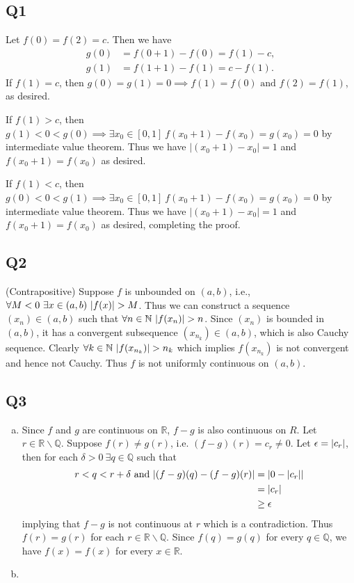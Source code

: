 \documentclass[12pt,lettersize]{article}
\newcommand{\R}{\mathbb{R}}
\newcommand{\Q}{\mathbb{Q}}
\newcommand{\N}{\mathbb{N}}
\begin{document}
	
	\subsection*{Q1}
	Let $f(0)=f(2)=c$. Then we have
	\begin{align*}
		g(0) &= f(0+1)-f(0)=f(1)-c,\\
		g(1) &= f(1+1)-f(1)=c-f(1).
	\end{align*}
	If $f(1)=c$, then $g(0)=g(1)=0\implies f(1)=f(0)\text{ and }f(2)=f(1)$, as desired.\smallskip
	
	If $f(1)>c$, then $g(1)<0<g(0)\implies \exists x_0\in[0,1]\ f(x_0+1)-f(x_0)=g(x_0)=0$ by intermediate value theorem. Thus we have $|(x_0+1)-x_0|=1$ and $f(x_0+1)=f(x_0)$ as desired.\smallskip
	
	If $f(1)<c$, then $g(0)<0<g(1)\implies \exists x_0\in[0,1]\ f(x_0+1)-f(x_0)=g(x_0)=0$ by intermediate value theorem. Thus we have $|(x_0+1)-x_0|=1$ and $f(x_0+1)=f(x_0)$ as desired, completing the proof.
	\newpage
	
	\subsection*{Q2}
	(Contrapositive) Suppose $f$ is unbounded on $(a,b)$, i.e., $\forall M<0\ \exists x\in(a,b)\ \abs{f(x)}>M$. Thus we can construct a sequence $(x_n)\in(a,b)$ such that $\forall n\in\N\ \abs{f(x_n)}>n$. Since $(x_n)$ is bounded in $(a,b)$, it has a convergent subsequence $(x_{n_k})\in(a,b)$, which is also Cauchy sequence. Clearly $\forall k\in\N\ \abs{f(x_{n_k})}>n_k$ which implies $f(x_{n_k})$ is not convergent and hence not Cauchy. Thus $f$ is not uniformly continuous on $(a,b)$.  
	\newpage
	
	\subsection*{Q3}
	\begin{enumerate}[(a)]
		\item Since $f$ and $g$ are continuous on $\R$, $f-g$ is also continuous on $R$. Let $r\in\R\backslash\Q$. Suppose $f(r)\neq g(r)$, i.e. $(f-g)(r)=c_r\neq 0$. Let $\epsilon=\abs{c_r}$, then for each $\delta>0\ \exists q\in\Q$ such that
		\begin{align*}
			r<q<r+\delta\text{ and }\abs{(f-g)(q)-(f-g)(r)} &= \abs{0-\abs{c_r}} \\ &= \abs{c_r}\\ &\geq\epsilon
		\end{align*}
		implying that $f-g$ is not continuous at $r$ which is a contradiction. Thus $f(r)=g(r)$ for each $r\in\R\backslash\Q$. Since $f(q)=g(q)$ for every $q\in\Q$, we have $f(x)=f(x)$ for every $x\in\R$.
		
		\item
	\end{enumerate}
	\newpage
	
\end{document}
